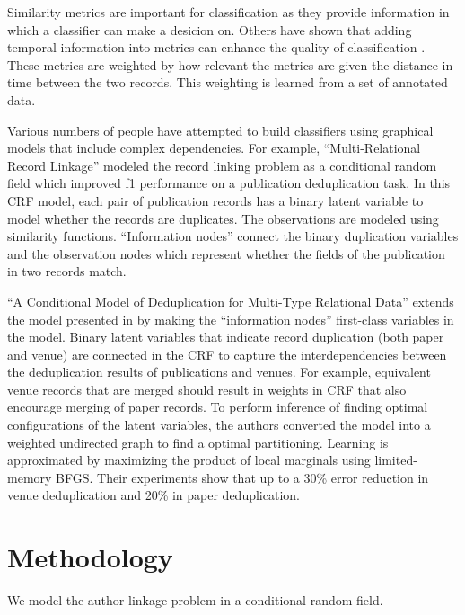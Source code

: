 \documentclass[twocolumn]{article}
\begin{document}
Similarity metrics are important for classification as they provide information in which a classifier can make a desicion on. Others have shown that adding temporal information into metrics can enhance the quality of classification \cite{DBLP:journals/fcsc/LiDMS12}. These metrics are weighted by how relevant the metrics are given the distance in time between the two records. This weighting is learned from a set of annotated data.

Various numbers of people have attempted to build classifiers using graphical models that include complex dependencies. For example, ``Multi-Relational Record Linkage'' \cite{Domingos04multi} modeled the record linking problem as a conditional random field which improved f1 performance on a publication deduplication task. In this CRF model, each pair of publication records has a binary latent variable to model whether the records are duplicates.  The observations are modeled using similarity functions.  ``Information nodes'' connect the binary duplication variables and the observation nodes which represent whether the fields of the publication in two records match.

``A Conditional Model of Deduplication for Multi-Type Relational Data'' \cite{Culotta05aconditional} extends the model presented in \cite{Domingos04multi} by making the ``information nodes'' first-class variables in the model.  Binary latent variables that indicate record duplication (both paper and venue) are connected in the CRF to capture the interdependencies between the deduplication results of publications and venues.  For example, equivalent venue records that are merged should result in weights in CRF that also encourage merging of paper records.  To perform inference of finding optimal configurations of the latent variables, the authors converted the model into a weighted undirected graph to find a optimal partitioning.  Learning is approximated by maximizing the product of local marginals using limited-memory BFGS.  Their experiments show that up to a 30\% error reduction in venue deduplication and 20\% in paper deduplication. 

\section{Methodology} %
\label{sec:methodology}
We model the author linkage problem in a conditional random field.
\end{document}
